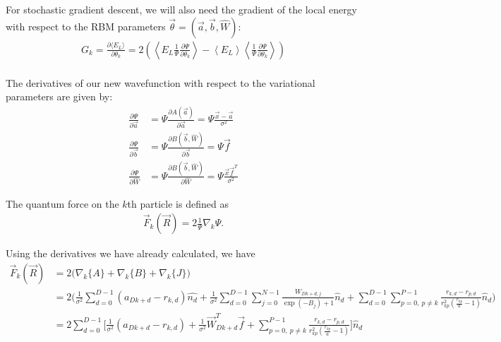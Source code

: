 \documentclass[12pt]{article}
\begin{document}
\noindent For stochastic gradient descent, we will also need the gradient of the local energy with respect to the RBM parameters $\vec{\theta}=(\vec{a},\vec{b},\hat{W})$:
\begin{align*}
G_k = \frac{\partial \langle E_L \rangle}{\partial \theta_k} = 2 \left( \left\langle E_L \frac{1}{\Psi} \frac{\partial \Psi}{\partial \theta_k} \right\rangle - \left\langle E_L \right\rangle \left\langle \frac{1}{\Psi} \frac{\partial \Psi}{\partial \theta_k} \right\rangle \right)\\
\end{align*}



\noindent The derivatives of our new wavefunction with respect to the variational parameters are given by:
\begin{align*}
\frac{\partial \Psi}{\partial \vec{a}} &= \Psi \frac{\partial A(\vec{a})}{\partial \vec{a}} = \Psi \frac{\vec{x}-\vec{a}}{\sigma^2}\\
\frac{\partial \Psi}{\partial \vec{b}} &= \Psi \frac{\partial B(\vec{b},\hat{W})}{\partial \vec{b}} = \Psi \vec{f} \\
\frac{\partial \Psi}{\partial \hat{W}} &= \Psi \frac{\partial B(\vec{b},\hat{W})}{\partial \hat{W}}
= \Psi \frac{\vec{x} \vec{f}^T}{\sigma^2}
\end{align*}


\noindent The quantum force on the $k$th particle is defined as 
\begin{align}
\vec{F}_k(\vec{R}) = 2 \frac{1}{\Psi} \nabla_k \Psi.
\end{align}

\noindent Using the derivatives we have already calculated, we have
\begin{align*}
\vec{F}_k(\vec{R}) &= 2 \Big( \nabla_k \{ A \} + \nabla_k \{ B \} +\nabla_k \{ J \} \Big)\\
&= 2 \bigg( \frac{1}{\sigma^2} \sum_{d=0}^{D-1} (a_{Dk+d} -r_{k,d} ) \hat{n_{d}}  
 + \frac{1}{\sigma^2} \sum_{d=0}^{D-1} \sum_{j=0}^{N-1}  \frac{W_{Dk+d,j}}{\exp(-B_j)+1}   \hat{n}_d  
 + \sum_{d=0}^{D-1} \sum_{p=0, \ p\neq k}^{P-1} \frac{r_{k,d}-r_{p,d}}{r_{kp}^2 \left( \frac{r_{kp}}{a} -1 \right)} \hat{n}_d
 \bigg)\\
 &= 2 \sum_{d=0}^{D-1} \bigg[ \frac{1}{\sigma^2} (a_{Dk+d} -r_{k,d} ) 
 + \frac{1}{\sigma^2} \vec{W}_{Dk+d}^T\vec{f}   
+ \sum_{p=0, \ p\neq k}^{P-1} \frac{r_{k,d}-r_{p,d}}{r_{kp}^2 \left( \frac{r_{kp}}{a} -1 \right)}
 \bigg]\hat{n}_d\\
\end{align*}
\end{document}
